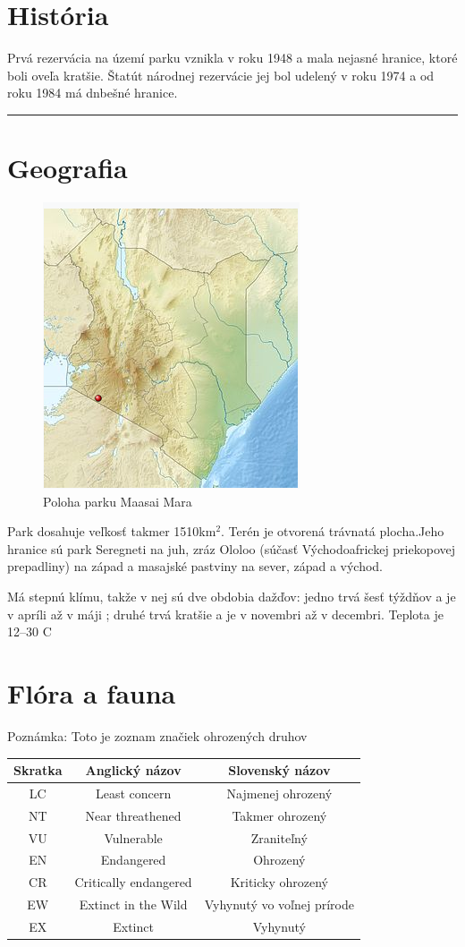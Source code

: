 \documentclass{article}
\begin{document}
\section{História}
Prvá rezervácia na území parku vznikla v roku 1948 a mala nejasné hranice, ktoré boli oveľa kratšie.
Štatút národnej rezervácie jej bol udelený v roku 1974 a od roku 1984 má dnbešné hranice.
\hrule

\section{Geografia}

\begin{figure}[h]
\includegraphics[scale=0.5]{location.png}\caption{Poloha parku Maasai Mara}
\end{figure} 
\medskip

Park dosahuje veľkosť takmer 1510km$^2$. Terén je otvorená trávnatá plocha.Jeho hranice sú park Seregneti na juh, 
zráz Ololoo (súčasť Východoafrickej priekopovej prepadliny) na západ
a masajské pastviny na sever, západ a východ.

Má stepnú klímu, takže v nej sú dve obdobia dažďov: jedno trvá šesť týždňov a je v apríli až v máji ; druhé trvá kratšie a je v novembri až v decembri.
Teplota je 12--30 \degree C
\noindent 
 
\newpage
\section{Flóra a fauna}
Poznámka: Toto je zoznam značiek ohrozených druhov\\
\begin{tabular}{ |c|c|c| }
\hline
Skratka & Anglický názov & Slovenský názov\\
\hline
 LC & Least concern & Najmenej ohrozený\\
\hline
 NT & Near threathened & Takmer ohrozený\\
\hline
 VU & Vulnerable & Zraniteľný \\
\hline
 EN & Endangered & Ohrozený \\
\hline
 CR & Critically endangered & Kriticky ohrozený\\
\hline
 EW & Extinct in the Wild & Vyhynutý vo voľnej prírode \\
\hline
 EX & Extinct & Vyhynutý \\   
\hline
\end{tabular}
\end{document}
